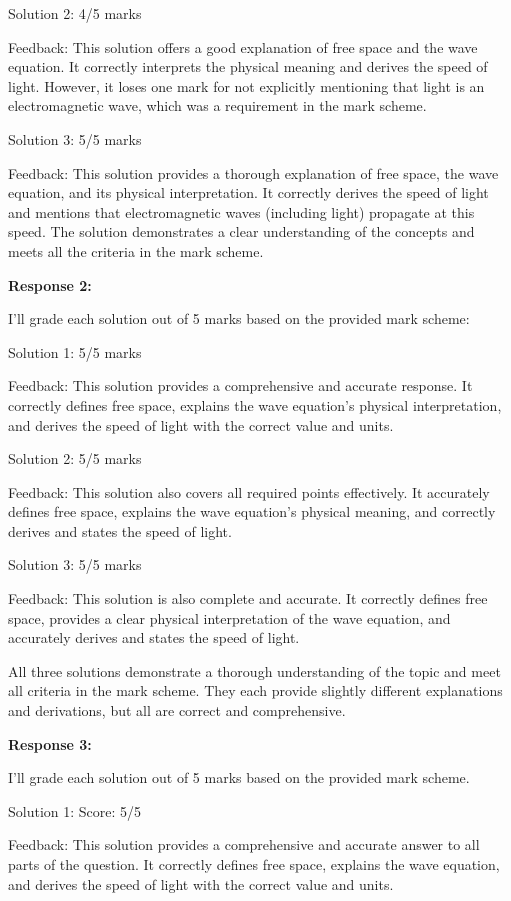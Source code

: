 \documentclass[a4paper,11pt]{article}
\begin{document}
Solution 2: 4/5 marks

Feedback: This solution offers a good explanation of free space and the wave equation. It correctly interprets the physical meaning and derives the speed of light. However, it loses one mark for not explicitly mentioning that light is an electromagnetic wave, which was a requirement in the mark scheme.

Solution 3: 5/5 marks

Feedback: This solution provides a thorough explanation of free space, the wave equation, and its physical interpretation. It correctly derives the speed of light and mentions that electromagnetic waves (including light) propagate at this speed. The solution demonstrates a clear understanding of the concepts and meets all the criteria in the mark scheme.

\bigskip
\textbf{Response 2:}

I'll grade each solution out of 5 marks based on the provided mark scheme:

Solution 1: 5/5 marks

Feedback: This solution provides a comprehensive and accurate response. It correctly defines free space, explains the wave equation's physical interpretation, and derives the speed of light with the correct value and units.

Solution 2: 5/5 marks

Feedback: This solution also covers all required points effectively. It accurately defines free space, explains the wave equation's physical meaning, and correctly derives and states the speed of light.

Solution 3: 5/5 marks

Feedback: This solution is also complete and accurate. It correctly defines free space, provides a clear physical interpretation of the wave equation, and accurately derives and states the speed of light.

All three solutions demonstrate a thorough understanding of the topic and meet all criteria in the mark scheme. They each provide slightly different explanations and derivations, but all are correct and comprehensive.

\bigskip
\textbf{Response 3:}

I'll grade each solution out of 5 marks based on the provided mark scheme.

Solution 1:
Score: 5/5

Feedback: This solution provides a comprehensive and accurate answer to all parts of the question. It correctly defines free space, explains the wave equation, and derives the speed of light with the correct value and units.
\end{document}
